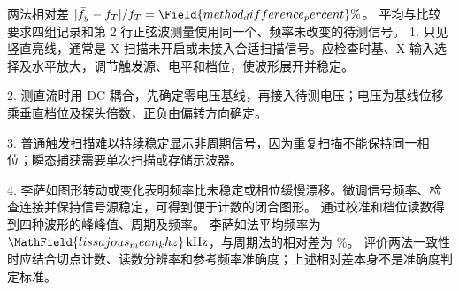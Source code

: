 两法相对差 $|\bar f_y-f_T|/f_T=\Field{method_difference_percent}\%$。
平均与比较要求四组记录和第 2 行正弦波测量使用同一个、频率未改变的待测信号。
1. 只见竖直亮线，通常是 X 扫描未开启或未接入合适扫描信号。应检查时基、X 输入选择及水平放大，调节触发源、电平和档位，使波形展开并稳定。\par
2. 测直流时用 DC 耦合，先确定零电压基线，再接入待测电压；电压为基线位移乘垂直档位及探头倍数，正负由偏转方向确定。\par
3. 普通触发扫描难以持续稳定显示非周期信号，因为重复扫描不能保持同一相位；瞬态捕获需要单次扫描或存储示波器。\par
4. 李萨如图形转动或变化表明频率比未稳定或相位缓慢漂移。微调信号频率、检查连接并保持信号源稳定，可得到便于计数的闭合图形。
通过校准和档位读数得到四种波形的峰峰值、周期及频率。
李萨如法平均频率为 $\MathField{lissajous_mean_khz}\,\mathrm{kHz}$，与周期法的相对差为 \%。
评价两法一致性时应结合切点计数、读数分辨率和参考频率准确度；上述相对差本身不是准确度判定标准。

\ReportRecord

